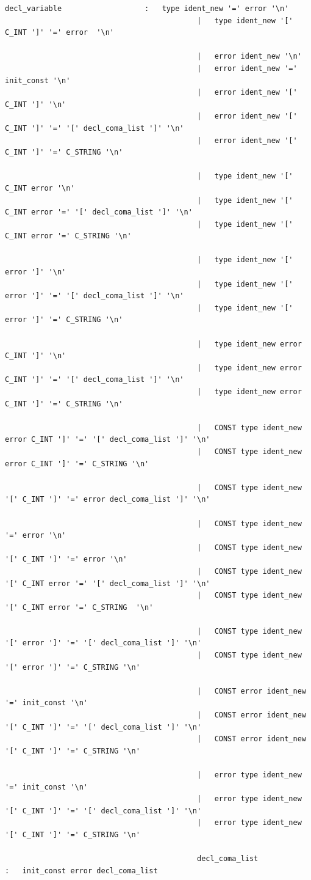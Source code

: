 \documentclass[a4paper,10pt]{article}
\begin{document}
\begin{lstlisting}
decl_variable					:	type ident_new '=' error '\n' 
											|	type ident_new '[' C_INT ']' '=' error  '\n' 
											
											|	error ident_new '\n'
											|	error ident_new '=' init_const '\n' 
											|	error ident_new '[' C_INT ']' '\n' 
											|	error ident_new '[' C_INT ']' '=' '[' decl_coma_list ']' '\n' 
											|	error ident_new '[' C_INT ']' '=' C_STRING '\n'
											
											|	type ident_new '[' C_INT error '\n' 
											|	type ident_new '[' C_INT error '=' '[' decl_coma_list ']' '\n'
											|	type ident_new '[' C_INT error '=' C_STRING '\n'
											
											|	type ident_new '[' error ']' '\n' 
											|	type ident_new '[' error ']' '=' '[' decl_coma_list ']' '\n'
											|	type ident_new '[' error ']' '=' C_STRING '\n'

											|	type ident_new error C_INT ']' '\n'
											|	type ident_new error C_INT ']' '=' '[' decl_coma_list ']' '\n'
											|	type ident_new error C_INT ']' '=' C_STRING '\n'

											|	CONST type ident_new error C_INT ']' '=' '[' decl_coma_list ']' '\n'
											|	CONST type ident_new error C_INT ']' '=' C_STRING '\n'
											
											|	CONST type ident_new '[' C_INT ']' '=' error decl_coma_list ']' '\n'
										
											|	CONST type ident_new '=' error '\n'
											|	CONST type ident_new '[' C_INT ']' '=' error '\n' 											
											|	CONST type ident_new '[' C_INT error '=' '[' decl_coma_list ']' '\n'
											|	CONST type ident_new '[' C_INT error '=' C_STRING  '\n'

											|	CONST type ident_new '[' error ']' '=' '[' decl_coma_list ']' '\n'
											|	CONST type ident_new '[' error ']' '=' C_STRING '\n'
											
											|	CONST error ident_new '=' init_const '\n'
											|	CONST error ident_new '[' C_INT ']' '=' '[' decl_coma_list ']' '\n'
											|	CONST error ident_new '[' C_INT ']' '=' C_STRING '\n'
											
											|	error type ident_new '=' init_const '\n'
											|	error type ident_new '[' C_INT ']' '=' '[' decl_coma_list ']' '\n'
											|	error type ident_new '[' C_INT ']' '=' C_STRING '\n'
											
											decl_coma_list				:	init_const error decl_coma_list 
\end{lstlisting}
\end{document}
